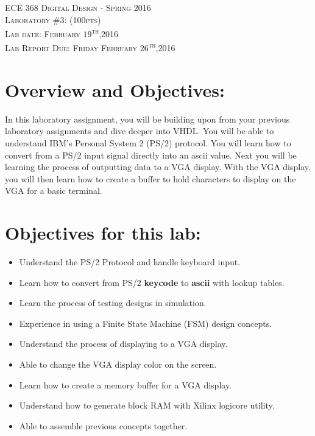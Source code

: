 \documentclass{article}
\begin{document}
\begin{center}
\textsc{\huge ECE 368 Digital Design - Spring 2016}\\[1cm]
\textsc{{\LARGE Laboratory \#3: (100pts)}}\\[0.5cm]
\textsc{\Large Lab date: February $19$\textsuperscript{th},2016}\\[0.5cm]
\textsc{\Large Lab Report Due: Friday February $26$\textsuperscript{th},2016}\\[1cm]
\end{center}

\section{Overview and Objectives:}
In this laboratory assignment, you will be building upon from your previous laboratory assignments and dive deeper into VHDL. You will be able to understand IBM's Personal System 2 (PS/2) protocol. You will learn how to convert from a PS/2 input signal directly into an ascii value. Next you will be learning the process of outputting data to a VGA display. With the VGA display, you will then learn how to create a buffer to hold characters to display on the VGA for a basic terminal.

\section{Objectives for this lab:}
\begin{itemize}
  \item Understand the PS/2 Protocol and handle keyboard input.
  \item Learn how to convert from PS/2 \textbf{keycode} to \textbf{ascii} with lookup tables.
  \item Learn the process of testing designs in simulation.
  \item Experience in using a Finite State Machine (FSM) design concepts.
  \item Understand the process of displaying to a VGA display.
  \item Able to change the VGA display color on the screen.
  \item Learn how to create a memory buffer for a VGA display.
  \item Understand how to generate block RAM with Xilinx\textsuperscript{\textregistered} logicore utility.
  \item Able to assemble previous concepts together.
\end{itemize}
\end{document}
